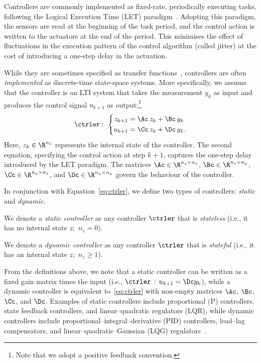 Controllers are commonly implemented as fixed-rate, periodically executing tasks, following the Logical Execution Time (LET) paradigm~\cite{Henzinger:2003,Kirsch:2012, Ernst:2018}.
Adopting this paradigm, the sensors are read at the beginning of the task period, and the control action is written to the actuators at the end of the period. 
This minimises the effect of fluctuations in the execution pattern of the control algorithm (called jitter) at the cost of introducing a one-step delay in the actuation.

While they are sometimes specified as transfer functions~\cite{Astrom:2008}, controllers are often \emph{implemented} as discrete-time state-space systems.
More specifically, we assume that the controller is an LTI system that takes the measurement $y_k$ as input and produces the control signal $u_{k+1}$ as output:\footnote{Note that we adopt a positive feedback convention.}
\begin{equation}
    \label{eq:ctrler}
    \ctrler: \,\, \left\{
    \begin{aligned}
        z_{k+1} &= \Ac\,z_k + \Bc\,y_k \\
        u_{k+1} &= \Cc\,z_{k} + \Dc\,y_k.
    \end{aligned}
    \right.
\end{equation}
Here, $z_k \in \R^{n_z}$ represents the internal state of the controller.
The second equation, specifying the control action at step $k+1$, captures the one-step delay introduced by the LET paradigm.
The matrices $\Ac \in \R^{n_z \times n_z}$, $\Bc \in \R^{n_z \times n_y}$, $\Cc \in \R^{n_u \times n_z}$, and $\Dc \in \R^{n_u \times n_y}$ govern the behaviour of the controller.

In conjunction with Equation~\eqref{eq:ctrler}, we define two types of controllers: \emph{static} and \emph{dynamic}.

\begin{definition}%
    We denote a \emph{static controller} as any controller $\ctrler$ that is \emph{stateless} (i.e., it has no internal state $z$;\, $n_z = 0$).
\end{definition}

\begin{definition}%
    We denote a \emph{dynamic controller} as any controller $\ctrler$ that is \emph{stateful} (i.e., it has an internal state $z$;\, $n_z\geq 1$).
\end{definition}

From the definitions above, we note that a static controller can be written as a fixed gain matrix times the input (i.e., $\ctrler \,:\, u_{k+1} = \Dc y_k$), while a dynamic controller is equivalent to~\eqref{eq:ctrler} with non-empty matrices $\Ac$, $\Bc$, $\Cc$, and $\Dc$.
Examples of static controllers include proportional (P) controllers, state feedback controllers, and linear--quadratic regulators (LQR), while dynamic controllers include proportional--integral--derivative (PID) controllers, lead--lag compensators, and linear--quadratic--Gaussian (LQG) regulators~\cite{Astrom:2008}.

